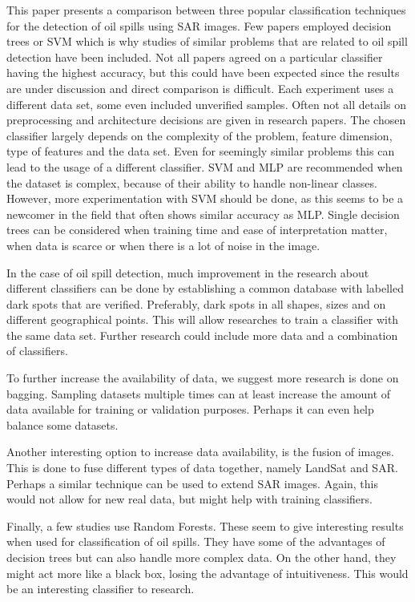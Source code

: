 This paper presents a comparison between three popular classification techniques for the detection of oil spills using SAR images. Few papers employed decision trees or SVM which is why studies of similar problems that are related to oil spill detection have been included. Not all papers agreed on a particular classifier having the highest accuracy, but this could have been expected since the results are under discussion and direct comparison is difficult. Each experiment uses a different data set, some even included unverified samples. Often not all details on preprocessing and architecture decisions are given in research papers. The chosen classifier largely depends on the complexity of the problem, feature dimension, type of features and the data set. Even for seemingly similar problems this can lead to the usage of a different classifier. SVM and MLP are recommended when the dataset is complex, because of their ability to handle non-linear classes. However, more experimentation with SVM should be done, as this seems to be a newcomer in the field that often shows similar accuracy as MLP. Single decision trees can be considered when training time and ease of interpretation matter, when data is scarce or when there is a lot of noise in the image. 

In the case of oil spill detection, much improvement in the research about different classifiers can be done by establishing a common database with labelled dark spots that are verified. Preferably, dark spots in all shapes, sizes and on different geographical points. This will allow researches to train a classifier with the same data set. Further research could include more data and a combination of classifiers.

To further increase the availability of data, we suggest more research is done on bagging. Sampling datasets multiple times can at least increase the amount of data available for training or validation purposes. Perhaps it can even help balance some datasets.

Another interesting option to increase data availability, is the fusion of images. This is done to fuse different types of data together, namely LandSat and SAR. Perhaps a similar technique can be used to extend SAR images. Again, this would not allow for new real data, but might help with training classifiers.

Finally, a few studies use Random Forests. These seem to give interesting results when used for classification of oil spills. They have some of the advantages of decision trees but can also handle more complex data. On the other hand, they might act more like a black box, losing the advantage of intuitiveness. This would be an interesting classifier to research.
